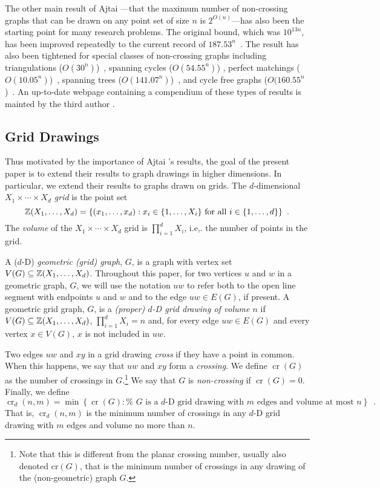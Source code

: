 \documentclass{patmorin}
\DeclareMathOperator{\crs}{cr}
\begin{document}
The other main result of Ajtai \etal---that the maximum number
of non-crossing graphs that can be drawn on any point set of
size $n$ is $2^{O(n)}$---has also been the starting point
for many research problems. The original bound, which was
$10^{13n}$, has been improved repeatedly to the current record of
$187.53^n$~\cite{sharir.sheffer:counting*1}.  The result has also
been tightened for special classes of non-crossing graphs including
triangulations ($O(30^n)$)~\cite{sharir.sheffer:counting}, spanning
cycles ($O(54.55^n)$) \cite{sharir.sheffer.ea:counting}, perfect
matchings ($O(10.05^n)$)~\cite{sharir.welzl:on}, spanning trees
($O(141.07^n)$)~\cite{hoffmann.sharir.ea:counting}, and cycle free graphs
($O(160.55^n$)~\cite{hoffmann.sharir.ea:counting,sharir.sheffer:counting}.
An up-to-date webpage containing a compendium of these types of results
is mainted by the third author \cite{sheffer:numbers}.

\subsection{Grid Drawings}

Thus motivated by the importance of Ajtai \etal's results, the goal
of the present paper is to extend their results to graph drawings in
higher dimensions.  In particular, we extend their results to graphs
drawn on grids.  The $d$-dimensional \emph{$X_1\times\cdots\times X_d$
grid} is the point set
\[  \mathbb{Z}(X_1,\ldots,X_d) = \{(x_1,\ldots,x_d): 
      \mbox{$x_i\in\{1,\ldots,X_i\}$ for all $i\in\{1,\ldots,d\}$}\}
	\enspace .\]
The \emph{volume} of the $X_1\times\cdots\times X_d$ grid is
$\prod_{i=1}^d X_i$, i.e,. the number of points in the grid.

A ($d$-D) \emph{geometric (grid) graph}, $G$, is a graph with vertex
set $V(G)\subseteq \mathbb{Z}(X_1,\ldots,X_d)$.  Throughout this paper, for two
vertices $u$ and $w$ in a geometric graph, $G$, we will use the notation
$uw$ to refer both to the open line segment with endpoints $u$ and $w$
and to the edge $uw\in E(G)$, if present.  A geometric grid graph, $G$,
is a \emph{(proper) $d$-D grid drawing of volume $n$} if $V(G)\subseteq
\mathbb{Z}(X_1,\ldots,X_d)$, $\prod_{i=1}^d X_i = n$ and, for every edge $uw\in
E(G)$ and every vertex $x\in V(G)$, $x$ is not included in $uw$.

Two edges $uw$ and $xy$ in a grid drawing \emph{cross} if they have a
point in common.  When this happens, we say that $uw$ and $xy$ form
a \emph{crossing}.  We define $\crs(G)$ as the number of crossings
in $G$.\footnote{Note that this is different from the planar crossing
number, usually also denoted $\mathrm{cr}(G)$, that is the minimum number of
crossings in any drawing of the (non-geometric) graph $G$.}  We say that
$G$ is \emph{non-crossing} if $\crs(G)=0$.  Finally, we define
\[ \crs_d(n,m)=\min\left\{\crs(G):\mbox{%
    $G$ is a $d$-D grid drawing with $m$ edges and volume at most $n$}
   \right\} \enspace .
\]
That is, $\crs_d(n,m)$ is the minimum number of crossings in any
$d$-D grid drawing with $m$ edges and volume no more than $n$.
\end{document}
